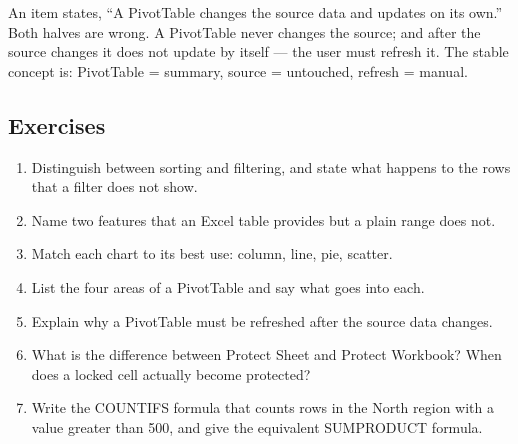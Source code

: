 \begin{example}
An item states, ``A PivotTable changes the source data and updates on its own.''
Both halves are wrong. A PivotTable never changes the source; and after the
source changes it does not update by itself --- the user must refresh it. The
stable concept is: PivotTable = summary, source = untouched, refresh = manual.
\end{example}

\subsection*{Exercises}
\begin{enumerate}[label=\arabic*.]
  \item Distinguish between sorting and filtering, and state what happens to the
    rows that a filter does not show.
  \item Name two features that an Excel table provides but a plain range does
    not.
  \item Match each chart to its best use: column, line, pie, scatter.
  \item List the four areas of a PivotTable and say what goes into each.
  \item Explain why a PivotTable must be refreshed after the source data
    changes.
  \item What is the difference between Protect Sheet and Protect Workbook?
    When does a locked cell actually become protected?
  \item Write the COUNTIFS formula that counts rows in the North region with a
    value greater than 500, and give the equivalent SUMPRODUCT formula.
\end{enumerate}

